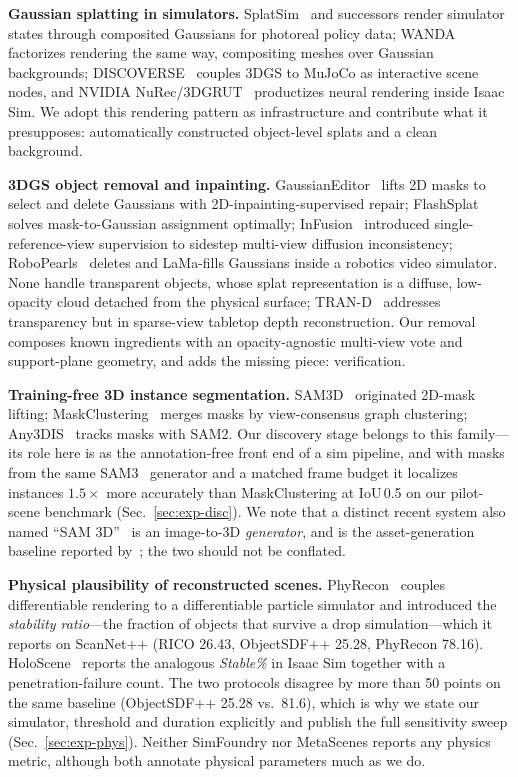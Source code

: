 \textbf{Gaussian splatting in simulators.}
SplatSim~\cite{splatsim} and successors render simulator states through
composited Gaussians for photoreal policy data; WANDA~\cite{wanda}
factorizes rendering the same way, compositing meshes over Gaussian
backgrounds; DISCOVERSE~\cite{discoverse} couples 3DGS to MuJoCo as
interactive scene nodes, and NVIDIA NuRec/3DGRUT~\cite{threedgut}
productizes neural rendering inside Isaac Sim. We adopt this rendering
pattern as infrastructure and contribute what it presupposes:
automatically constructed object-level splats and a clean background.

\textbf{3DGS object removal and inpainting.}
GaussianEditor~\cite{gaussianeditor} lifts 2D masks to select and delete
Gaussians with 2D-inpainting-supervised repair; FlashSplat~\cite{flashsplat}
solves mask-to-Gaussian assignment optimally; InFusion~\cite{infusion}
introduced single-reference-view supervision to sidestep multi-view
diffusion inconsistency; RoboPearls~\cite{robopearls} deletes and
LaMa-fills Gaussians inside a robotics video simulator. None handle
transparent objects, whose splat representation is a diffuse, low-opacity
cloud detached from the physical surface; TRAN-D~\cite{trand} addresses
transparency but in sparse-view tabletop depth reconstruction. Our
removal composes known ingredients with an opacity-agnostic multi-view
vote and support-plane geometry, and adds the missing piece: verification.

\textbf{Training-free 3D instance segmentation.}
SAM3D~\cite{sam3d} originated 2D-mask lifting;
MaskClustering~\cite{maskclustering} merges masks by view-consensus graph
clustering; Any3DIS~\cite{any3dis} tracks masks with SAM2. Our discovery
stage belongs to this family---its role here is as the annotation-free
front end of a sim pipeline, and with masks from the same SAM3~\cite{sam3}
generator and a matched frame budget it localizes instances $1.5\times$
more accurately than MaskClustering at IoU\,0.5 on our pilot-scene
benchmark (Sec.~\ref{sec:exp-disc}). We note that a distinct recent
system also named ``SAM 3D''~\cite{sam3dgen} is an image-to-3D
\emph{generator}, and is the asset-generation baseline reported
by~\cite{simfoundry}; the two should not be conflated.

\textbf{Physical plausibility of reconstructed scenes.}
PhyRecon~\cite{phyrecon} couples differentiable rendering to a
differentiable particle simulator and introduced the \emph{stability
ratio}---the fraction of objects that survive a drop simulation---which it
reports on ScanNet++ (RICO 26.43, ObjectSDF++ 25.28, PhyRecon 78.16).
HoloScene~\cite{holoscene} reports the analogous \emph{Stable\%} in Isaac
Sim together with a penetration-failure count. The two protocols disagree
by more than 50 points on the same baseline (ObjectSDF++ 25.28
vs.\ 81.6), which is why we state our simulator, threshold and duration
explicitly and publish the full sensitivity sweep
(Sec.~\ref{sec:exp-phys}). Neither SimFoundry nor MetaScenes reports any
physics metric, although both annotate physical parameters much as we do.

